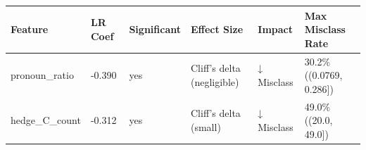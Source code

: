 \begin{tabular}{llllll}
\toprule
Feature & LR Coef & Significant & Effect Size & Impact & Max Misclass Rate \\
\midrule
pronoun\_ratio & -0.390 & yes & Cliff's delta (negligible) & ↓ Misclass & 30.2\% ((0.0769, 0.286]) \\
hedge\_C\_count & -0.312 & yes & Cliff's delta (small) & ↓ Misclass & 49.0\% ((20.0, 49.0]) \\
\bottomrule
\end{tabular}
